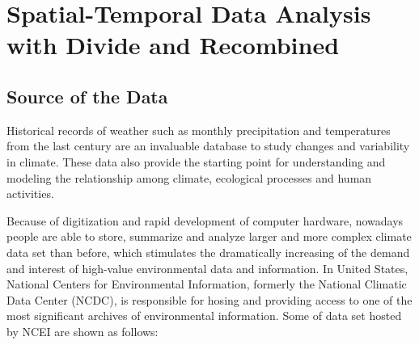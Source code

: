 \chapter{Spatial-Temporal Data Analysis with Divide and Recombined}

\section{Source of the Data}

Historical records of weather such as monthly precipitation and temperatures from 
the last century are an invaluable database to study changes and variability in 
climate. These data also provide the starting point for understanding and modeling 
the relationship among climate, ecological processes and human activities. 

Because of digitization and rapid development of computer hardware, nowadays
people are able to store, summarize and analyze larger and more 
complex climate data set than before, which stimulates the dramatically 
increasing  of the demand and interest of high-value environmental data and 
information. In United States, National Centers for Environmental Information, 
formerly the National Climatic Data Center (NCDC), is responsible for hosing and 
providing access to one of the most significant archives of environmental 
information. Some of data set hosted by NCEI \cite{NCEI} are shown as follows:

